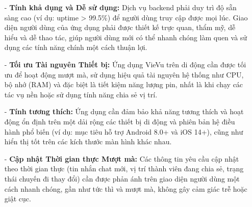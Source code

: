 \begin{itemize}
    \item[-] \textbf{Tính khả dụng và Dễ sử dụng:} Dịch vụ backend phải duy trì độ sẵn sàng cao (ví dụ: uptime > 99.5\%) để người dùng truy cập được mọi lúc. Giao diện người dùng của ứng dụng phải được thiết kế trực quan, thẩm mỹ, dễ hiểu và dễ thao tác, giúp người dùng mới có thể nhanh chóng làm quen và sử dụng các tính năng chính một cách thuận lợi.

    \item[-] \textbf{Tối ưu Tài nguyên Thiết bị:} Ứng dụng VieVu trên di động cần được tối ưu để hoạt động mượt mà, sử dụng hiệu quả tài nguyên hệ thống như CPU, bộ nhớ (RAM) và đặc biệt là tiết kiệm năng lượng pin, nhất là khi chạy các tác vụ nền hoặc sử dụng tính năng chia sẻ vị trí.

    \item[-] \textbf{Tính tương thích:} Ứng dụng cần đảm bảo khả năng tương thích và hoạt động ổn định trên một dải rộng các thiết bị di động và phiên bản hệ điều hành phổ biến (ví dụ: mục tiêu hỗ trợ Android 8.0+ và iOS 14+), cũng như hiển thị tốt trên các kích thước màn hình khác nhau.

    \item[-] \textbf{Cập nhật Thời gian thực Mượt mà:} Các thông tin yêu cầu cập nhật theo thời gian thực (tin nhắn chat mới, vị trí thành viên đang chia sẻ, trạng thái chuyến đi thay đổi) cần được phản ánh trên giao diện người dùng một cách nhanh chóng, gần như tức thì và mượt mà, không gây cảm giác trễ hoặc giật cục.

\end{itemize}
